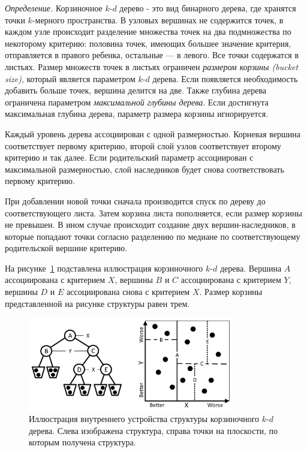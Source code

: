 \emph{Определение.} Корзиночное $k$-$d$ дерево - это вид бинарного дерева, где хранятся точки $k$-мерного пространства. В узловых вершинах не содержится точек, в каждом узле происходит разделение множества точек на два подмножества по некоторому критерию: половина точек, имеющих большее значение критерия, отправляется в правого ребенка, остальные {---} в левого. Все точки содержатся в листьях. Размер множеств точек в листьях ограничен \emph{размером корзины (bucket size)}, который является параметром $k$-$d$ дерева. Если появляется необходимость добавить больше точек, вершина делится на две. Также глубина дерева ограничена параметром \emph{максимальной глубины дерева}. Если достигнута максимальная глубина дерева, параметр размера корзины игнорируется. 

Каждый уровень дерева ассоциирован с одной размерностью. Корневая вершина соответствует первому критерию, второй слой узлов соответствует второму критерию и так далее. Если родительский параметр ассоциирован с максимальной размерностью, слой наследников будет снова соответствовать первому критерию. 

При добавлении новой точки сначала производится спуск по дереву до соответствующего листа. Затем корзина листа пополняется, если размер корзины не превышен. В ином случае происходит создание двух вершин-наследников, в которые попадают точки согласно разделению по медиане по соответствующему родительской вершине критерию.

На рисунке~\ref{ndt_explanation} подставлена иллюстрация корзиночного $k$-$d$ дерева. Вершина $A$ ассоциирована с критерием $X$, вершины $B$ и $C$ ассоциирована с критерием $Y$, вершины $D$ и $E$ ассоциирована снова с критерием $X$. Размер корзины представленной на рисунке структуры равен трем.

\begin{figure}[!h]
\begin{center}
\includegraphics[width=0.8\textwidth]{pic/ndt_explanation.png}
\caption{Иллюстрация внутреннего устройства структуры корзиночного $k$-$d$ дерева. Слева изображена структура, справа точки на плоскости, по которым получена структура.}
\label{ndt_explanation}
\end{center}
\end{figure}

